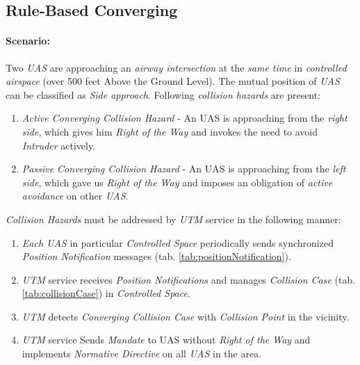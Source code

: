 \subsection{Rule-Based Converging}\label{s:testRuleConverging}

\paragraph{Scenario:} Two \emph{UAS} are approaching an \emph{airway intersection} at the \emph{same time} in \emph{controlled airspace} (over 500 feet Above the Ground Level). The mutual position of \emph{UAS} can be classified as \emph{Side approach}. Following \emph{collision hazards} are present:

\begin{enumerate}
    \item \emph{Active Converging Collision Hazard} -  An UAS is approaching from the \emph{right side}, which gives him \emph{Right of the Way} and invokes the need to avoid \emph{Intruder} actively.

	\item \emph{Passive Converging Collision Hazard} - An UAS is approaching from the \emph{left side}, which gave us \emph{Right of the Way} and imposes an obligation of \emph{active avoidance} on other \emph{UAS}.
	
\end{enumerate}


\noindent\emph{Collision Hazards} must be addressed by \emph{UTM} service in the following manner:


\begin{enumerate}
	\item \emph{Each UAS} in particular \emph{Controlled Space} periodically sends synchronized \emph{Position Notification} messages (tab. \ref{tab:positionNotification}). 
	
	\item \emph{UTM} service receives \emph{Position Notifications} and manages \emph{Collision Case} (tab. \ref{tab:collisionCase}) in \emph{Controlled Space}. 
	
	\item \emph{UTM} detects \emph{Converging Collision Case} with \emph{Collision Point} in  the vicinity.
	
	\item \emph{UTM} service Sends \emph{Mandate} to UAS without \emph{Right of the Way} and implements \emph{Normative Directive} on all \emph{UAS} in the area.
\end{enumerate}


